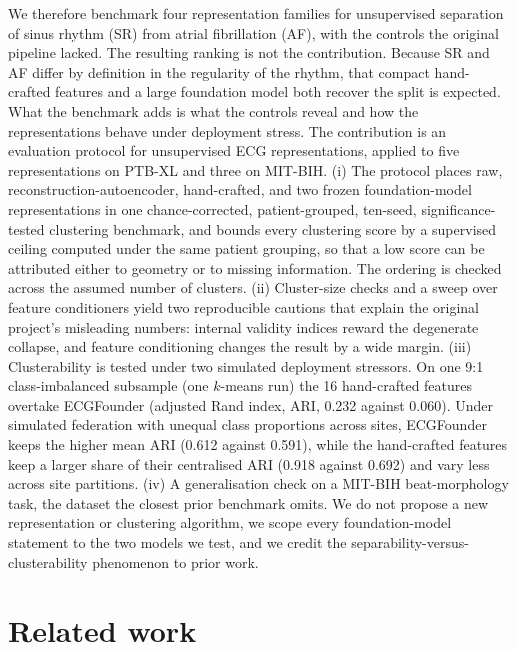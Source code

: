 \documentclass[preprint,11pt]{elsarticle}
\begin{document}
We therefore benchmark four representation families for unsupervised separation of
sinus rhythm (SR) from atrial fibrillation (AF), with the controls the original pipeline
lacked. The resulting ranking is not the contribution. Because SR and AF differ by
definition in the regularity of the rhythm, that compact hand-crafted features and a
large foundation model both recover the split is expected. What the benchmark adds is
what the controls reveal and how the representations behave under deployment stress.
The contribution is an evaluation protocol for unsupervised ECG representations, applied
to five representations on PTB-XL and three on MIT-BIH. (i) The protocol places raw, reconstruction-autoencoder,
hand-crafted, and two frozen foundation-model representations in one chance-corrected,
patient-grouped, ten-seed, significance-tested clustering benchmark, and bounds every
clustering score by a supervised ceiling computed under the same patient grouping, so that
a low score can be attributed either to geometry or to missing information. The ordering
is checked across the assumed number of clusters. (ii) Cluster-size checks and a sweep
over feature conditioners yield two reproducible cautions that explain the original
project's misleading numbers: internal validity indices reward the degenerate collapse,
and feature conditioning changes the result by a wide margin. (iii) Clusterability is
tested under two simulated deployment stressors. On one 9:1 class-imbalanced subsample
(one $k$-means run) the 16 hand-crafted features overtake ECGFounder (adjusted Rand index, ARI, 0.232 against
0.060). Under simulated
federation with unequal class proportions across sites, ECGFounder keeps the higher mean
ARI (0.612 against 0.591), while the hand-crafted features keep a larger share of their
centralised ARI (0.918 against 0.692) and vary less across site partitions. (iv) A
generalisation check on a MIT-BIH beat-morphology task, the dataset the closest prior
benchmark omits. We do not propose a new representation or clustering algorithm, we scope
every foundation-model statement to the two models we test, and we credit the
separability-versus-clusterability phenomenon to prior work.

\section{Related work}\label{sec:related}
\end{document}
